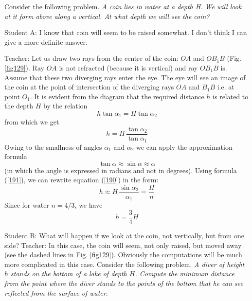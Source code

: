 \documentclass[a4paper,12pt]{book}
\begin{document}
{Consider the following problem. \emph{A coin lies in water at a depth H. We will look at it form above along a vertical. At what depth we will see the coin?}

{\sc Student A:} I know that coin will seem to be raised somewhat. I don't think I can give a more definite answer. 

{\sc Teacher:} Let us draw two rays from the centre of the coin: $OA$ and $OB_{1}B$ (Fig. \ref{fig129}). Ray $OA$ is not refracted (because it is vertical) and ray $OB_{1}B$ is. Assume that these two diverging rays enter the eye. The eye will see an image of the coin at the point of intersection of the diverging rays $OA$ and $B_{1}B$ i.e. at point $O_{1}$. It is evident from the diagram that the required distance $h$ is related to the depth $H$ by the relation
\begin{equation*}
h \tan \alpha_{1} = H \tan \alpha_{2} \label{190}
\end{equation*}
 from which we get
 \begin{equation}
h =H \, \frac{\tan \alpha_{2}}{\tan \alpha_{1}}
\end{equation}
 Owing to the smallness of angles $\alpha_{1}$ and $\alpha_{2}$ we can apply the approximation formula
 \begin{equation}
\tan \alpha \approx \sin \alpha \approx \alpha \label{191}
\end{equation}
(in which the angle is expressed in radians and not in degrees). Using formula (\ref{191}), we can rewrite equation (\ref{190}) in the form:
\begin{equation}
h \approx H \, \frac{\sin \alpha_{2}}{\alpha_{1}} = \frac{H}{n}
\end{equation}
Since for water $n = 4/3$, we have
\begin{equation*}
h = \frac{3}{4}H
\end{equation*}



{\sc Student B:} What will happen if we look at the coin, not vertically, but from one side?
{\sc Teacher:} In this case, the coin will seem, not only raised, but moved away (see the dashed lines in Fig. \ref{fig129}). Obviously the computations will be much more complicated in this case. Consider the following problem. \emph{A diver of height $h$ stands on the bottom of a lake of depth $H$. Compute the minimum distance from the point where the diver stands to the points of the bottom that he can see reflected from the surface of water}.

}
\end{document}
